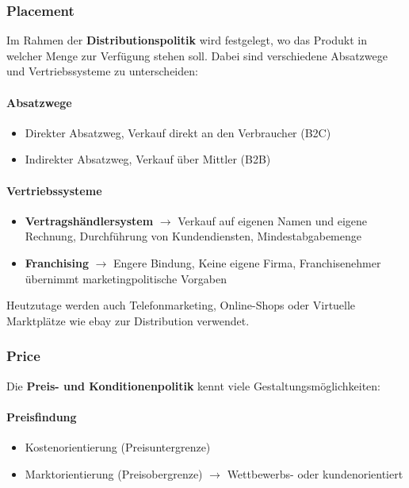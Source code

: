 \documentclass[titlepage,parskip=half]{scrartcl}
\begin{document}
\subsubsection{Placement}
Im Rahmen der \textbf{Distributionspolitik} wird festgelegt, wo das Produkt in welcher Menge zur Verfügung stehen soll. Dabei sind verschiedene Absatzwege und Vertriebssysteme zu unterscheiden:

\paragraph{Absatzwege}
\begin{itemize}
    \item Direkter Absatzweg, Verkauf direkt an den Verbraucher (B2C)
    \item Indirekter Absatzweg, Verkauf über Mittler (B2B)
\end{itemize}

\paragraph{Vertriebssysteme}
\begin{itemize}
    \item \textbf{Vertragshändlersystem} $\rightarrow$ Verkauf auf eigenen Namen und eigene Rechnung, Durch\-füh\-rung von Kundendiensten, Mindestabgabemenge
    \item \textbf{Franchising} $\rightarrow$ Engere Bindung, Keine eigene Firma, Franchisenehmer übernimmt marketingpolitische Vorgaben
\end{itemize}

Heutzutage werden auch Telefonmarketing, Online-Shops oder Virtuelle Marktplätze wie ebay zur Distribution verwendet.

\subsubsection{Price}
Die \textbf{Preis- und Konditionenpolitik} kennt viele Gestaltungsmöglichkeiten:

\paragraph{Preisfindung}
\begin{itemize}
    \item Kostenorientierung (Preisuntergrenze)
    \item Marktorientierung (Preisobergrenze) $\rightarrow$ Wettbewerbs- oder kundenorientiert
\end{itemize}
\end{document}
